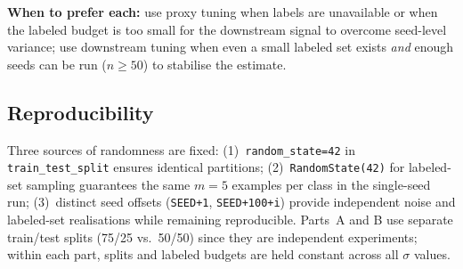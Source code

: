 \documentclass[11pt]{article}
\begin{document}
\textbf{When to prefer each:} use proxy tuning when labels are unavailable or
when the labeled budget is too small for the downstream signal to overcome
seed-level variance; use downstream tuning when even a small labeled set
exists \emph{and} enough seeds can be run ($n \geq 50$) to stabilise the
estimate.

\subsection{Reproducibility}
Three sources of randomness are fixed: (1)~\texttt{random\_state=42} in
\texttt{train\_test\_split} ensures identical partitions;
(2)~\texttt{RandomState(42)} for labeled-set sampling guarantees the same
$m{=}5$ examples per class in the single-seed run; (3)~distinct seed offsets
(\texttt{SEED+1}, \texttt{SEED+100+i}) provide independent noise and
labeled-set realisations while remaining reproducible. Parts~A and B use
separate train/test splits (75/25 vs.\ 50/50) since they are independent
experiments; within each part, splits and labeled budgets are held constant
across all $\sigma$ values.
\end{document}

